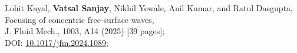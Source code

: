 	\item Lohit Kayal, \textbf{Vatsal Sanjay}, Nikhil Yewale, Anil Kumar, and Ratul Dasgupta,\\
	Focusing of concentric free-surface waves,\\
	J. Fluid Mech., 1003, A14 (2025) [39 pages];\\
	\faFile\hspace{0.2em}DOI: \href{https://doi.org/10.1017/jfm.2024.1089}{10.1017/jfm.2024.1089};\\
